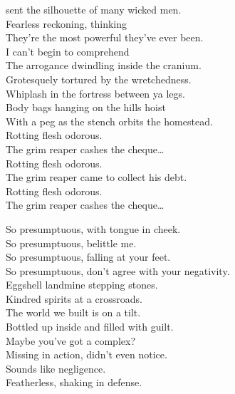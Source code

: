  sent the silhouette of many wicked men. \\
Fearless reckoning, thinking \\
They're the most powerful they've ever been. \\
I can't begin to comprehend \\
The arrogance dwindling inside the cranium. \\

Grotesquely tortured by the wretchedness. \\
Whiplash in the fortress between ya legs. \\
Body bags hanging on the hills hoist \\
With a peg as the stench orbits the homestead. \\

Rotting flesh odorous. \\
The grim reaper cashes the cheque… \\
Rotting flesh odorous. \\
The grim reaper came to collect his debt. \\

Rotting flesh odorous. \\
The grim reaper cashes the cheque… \\





So presumptuous, with tongue in cheek. \\
So presumptuous, belittle me. \\
So presumptuous, falling at your feet. \\
So presumptuous, don't agree with your negativity. \\

Eggshell landmine stepping stones. \\
Kindred spirits at a crossroads. \\
The world we built is on a tilt. \\
Bottled up inside and filled with guilt. \\
Maybe you've got a  complex? \\
Missing in action, didn't even notice. \\
Sounds like negligence. \\
Featherless, shaking in defense. \\

